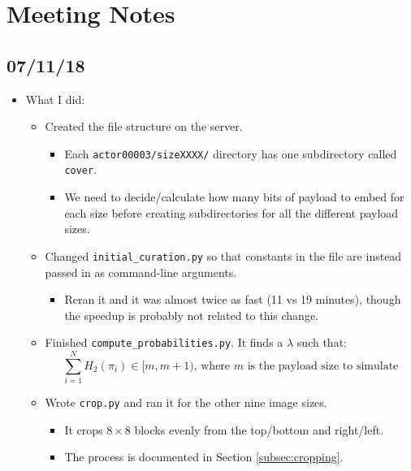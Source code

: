 \documentclass[11pt,a4paper]{report}
\begin{document}
\chapter{Meeting Notes}

\section{07/11/18}

\begin{itemize}

\item What I did:
  \begin{itemize}
  \item Created the file structure on the server.
    \begin{itemize}
    \item Each \texttt{actor00003/sizeXXXX/} directory has one subdirectory called \texttt{cover}.
    \item We need to decide/calculate how many bits of payload to embed for each size before creating subdirectories for all the different payload sizes.
    \end{itemize}

  \item Changed \texttt{initial\_curation.py} so that constants in the file are instead passed in as command-line arguments.
    \begin{itemize}
    \item Reran it and it was almost twice as fast (11 vs 19 minutes), though the speedup is probably not related to this change.
    \end{itemize}

  \item Finished \texttt{compute\_probabilities.py}. It finds a $\lambda$ such that:
    \begin{equation*}
    \sum\limits_{i=1}^N H_2(\pi_i) \in [m, m+1)\text{, where $m$ is the payload size to simulate}
    \end{equation*}

  \item Wrote \texttt{crop.py} and ran it for the other nine image sizes.
    \begin{itemize}
    \item It crops $8\times8$ blocks evenly from the top/bottom and right/left.
    \item The process is documented in Section \ref{subsec:cropping}.
    \end{itemize}


\end{itemize}
\end{itemize}
\end{document}
